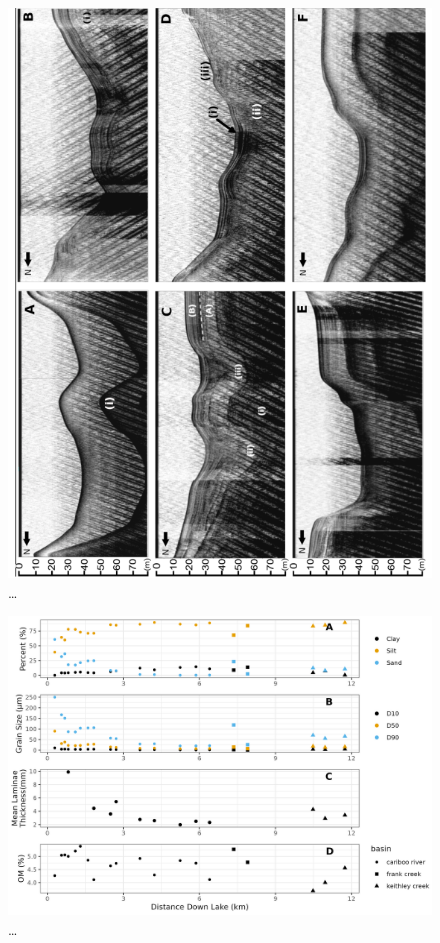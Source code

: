 \documentclass[
  letterpaper,
  DIV=11,
  numbers=noendperiod]{scrartcl}
\begin{document}
\begin{figure}

{\centering \includegraphics[width=1\textwidth,height=\textheight]{figs/acoustics_6_panel.png}

}

\caption{\label{fig-acoustics}\ldots{}}

\end{figure}

\begin{figure}

{\centering \includegraphics[width=1\textwidth,height=\textheight]{figs/ekman_seds.jpg}

}

\caption{\label{fig-ekmanSeds}\ldots{}}

\end{figure}
\end{document}
